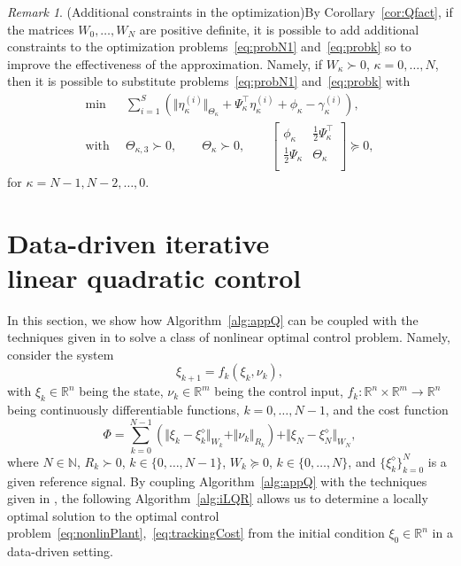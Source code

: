 \documentclass[10pt]{IEEEtran}      %
\newcommand{\R}{\mathbb{R}}
\newcommand{\N}{\mathbb{N}}
\theoremstyle{theorem}
\theoremstyle{remark}
\newtheorem{remm}{Remark}
\begin{document}
\begin{remm}(Additional constraints in the optimization)\label{rem:addcon}
By Corollary~\ref{cor:Qfact}, if the matrices $W_0,\dots,W_N$ are positive definite, it is possible to add additional constraints
to the optimization problems~\eqref{eq:probN1} and~\eqref{eq:probk} so to improve the effectiveness of the approximation. 
Namely, if $W_\kappa\succ 0$, $\kappa=0,\dots,N$, then it is possible
to substitute problems~\eqref{eq:probN1} and~\eqref{eq:probk} with
\begin{align*}
\min\,&\sum_{i=1}^{S} \left(\Vert \eta_{\kappa}^{(i)} \Vert_{\Theta_{\kappa}}
	+\Psi_{\kappa}^\top \eta_{\kappa}^{(i)} + \phi_{\kappa}-\gamma_{\kappa}^{(i)}\right),\\
\text{with }\,&\Theta_{\kappa,3} \succ 0,\qquad\Theta_{\kappa} \succ 0,\qquad\left[\begin{array}{cc}
\phi_{\kappa} & \tfrac{1}{2}\Psi_{\kappa}^\top \\ \tfrac{1}{2}\Psi_{\kappa} & \Theta_{\kappa}\\
\end{array}\right] \succeq 0,
		\end{align*}
for $\kappa=N-1,N-2,\dots,0$.
\end{remm}
\section{Data-driven iterative\\ linear quadratic control}
\label{sec:ddlqr}
In this section, we show how Algorithm~\ref{alg:appQ} can be coupled with the techniques given in \cite{li2004iterative}
 to solve a class of nonlinear optimal control problem.
Namely, consider the system
\begin{equation}\label{eq:nonlinPlant}
\xi_{k+1}=f_k(\xi_k,\nu_k),
\end{equation}
with $\xi_k\in\R^n$ being the state, $\nu_k\in\R^m$ being the control input, 
$f_k:\R^n\times \R^m\rightarrow\R^n$ being continuously differentiable functions, $k=0,\dots,N-1$,
and the cost function
\begin{equation}\label{eq:trackingCost}
\Phi = \sum_{k=0}^{N-1}\left(\Vert \xi_{k}-\xi_k^\diamond\Vert_{W_k}+\Vert \nu_k \Vert_{R_k}\right)+\Vert \xi_{N}-\xi_N^\diamond\Vert_{W_N},
\end{equation}
where $N\in \N$, $R_k\succ 0$, $k\in\{0,\dots,N-1\}$, $W_k\succeq 0$, $k\in\{0,\dots,N\}$, 
and $\{\xi_k^\diamond\}_{k=0}^N$ is a given reference signal.
By coupling Algorithm~\ref{alg:appQ} with the techniques given in \cite{li2004iterative}, the following Algorithm~\ref{alg:iLQR}
allows us to determine a locally optimal solution to the optimal control problem~\eqref{eq:nonlinPlant},~\eqref{eq:trackingCost}
from the initial condition $\xi_0\in\R^n$ in a data-driven setting.
\end{document}
